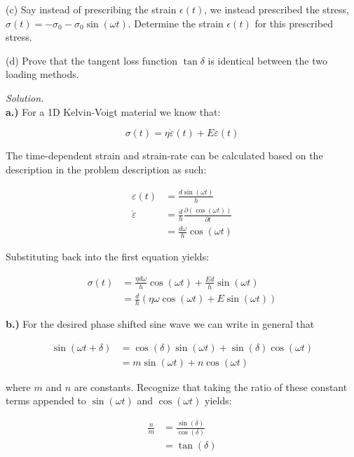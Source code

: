 \medskip
(c) Say instead of prescribing the strain $\epsilon(t)$, we instead prescribed the stress, $\sigma(t) = - \sigma_0 - \sigma_0 \sin(\omega t)$. 
Determine the strain $\epsilon(t)$ for this prescribed stress.

\medskip
(d) Prove that the tangent loss function $\tan\delta$ is identical between the two loading methods.

\bigskip

\textit{Solution.}\\

\textbf{a.)} For a 1D Kelvin-Voigt material we know that:

\begin{equation*}
\sigma(t) = \eta \dot\varepsilon(t) + E\varepsilon(t)
\end{equation*}

The time-dependent strain and strain-rate can be calculated based on the description in the problem description as such: 

\begin{align*}
    \varepsilon(t) &= \frac{d\sin(\omega t)}{h}\\
    \dot\varepsilon &= \frac{d}{h}\frac{\partial(\cos(\omega t))}{\partial t}\\
    &= \frac{d\omega}{h}\cos(\omega t)
\end{align*}

Substituting back into the first equation yields: 

\begin{align*}
    \sigma(t) &= \frac{\eta d\omega}{h} \cos{(\omega t)} + \frac{Ed}{h} \sin{(\omega t)} \\
    &= \frac{d}{h}(\eta \omega \cos{(\omega t)} + E\sin{(\omega t)})
\end{align*}

\textbf{b.)} For the desired phase shifted sine wave we can write in general that

\begin{align*}
    \sin{(\omega t + \delta)} &= \cos{(\delta)}\sin{(\omega t)} + \sin{(\delta)}\cos{(\omega t)} \\
    &= m\sin{(\omega t)} + n\cos{(\omega t)}
\end{align*}

where $m$ and $n$ are constants. Recognize that taking the ratio of these constant terms appended to $\sin{(\omega t)}$ and $\cos{(\omega t)}$ yields:

\begin{align*}
    \frac{n}{m} &= \frac{\sin{(\delta)}}{\cos{(\delta)}} \\
    &= \tan{(\delta)}
\end{align*}

